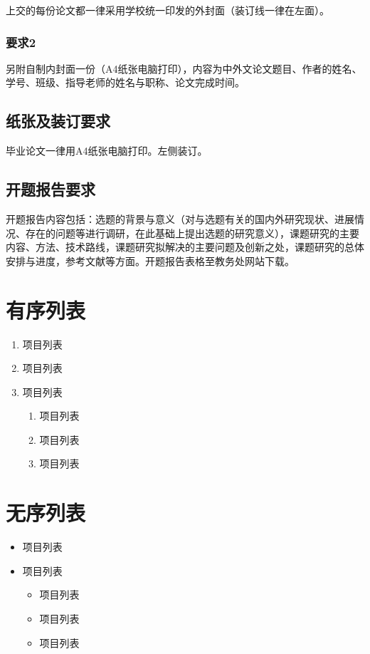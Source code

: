 \documentclass[12pt,a4paper,zihao=-4,UTF8]{book}
\begin{document}
上交的每份论文都一律采用学校统一印发的外封面（装订线一律在左面）。

\subsubsection{要求2}\label{2}

另附自制内封面一份（A4纸张电脑打印），内容为中外文论文题目、作者的姓名、学号、班级、指导老师的姓名与职称、论文完成时间。

\subsection{纸张及装订要求}

毕业论文一律用A4纸张电脑打印。左侧装订。

\subsection{开题报告要求}

开题报告内容包括：选题的背景与意义（对与选题有关的国内外研究现状、进展情况、存在的问题等进行调研，在此基础上提出选题的研究意义），课题研究的主要内容、方法、技术路线，课题研究拟解决的主要问题及创新之处，课题研究的总体安排与进度，参考文献等方面。开题报告表格至教务处网站下载。

\section{有序列表}

\begin{enumerate}
\def\labelenumi{\arabic{enumi}.}
\item
  项目列表
\item
  项目列表
\item
  项目列表

  \begin{enumerate}
  \def\labelenumii{\alph{enumii}.}
  \item
    项目列表
  \item
    项目列表
  \item
    项目列表
  \end{enumerate}
\end{enumerate}

\section{无序列表}

\begin{itemize}
\item
  项目列表
\item
  项目列表

  \begin{itemize}
  \item
    项目列表
  \item
    项目列表
  \item
    项目列表
  \end{itemize}
\end{itemize}
\end{document}
